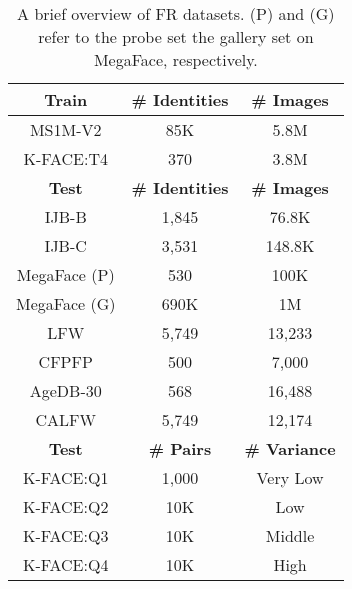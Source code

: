 \documentclass[10pt,twocolumn]{article}
\begin{document}
\begin{table}[!htbp]
    \caption{A brief overview of FR datasets. (P) and (G) refer to the probe set the gallery set on MegaFace, respectively.}
    \label{tab:datasets}
      \centering
        {\small
        \begin{tabular}[]{ c c c }
         \rowcolor{Cyan!20}
         \hline
         \textbf{Train} & \textbf{\# Identities} & \textbf{\# Images}  \\
         \hline
         MS1M-V2\cite{deng2019arcface} & 85K & 5.8M \\
         K-FACE:T4\cite{choi2021k} & 370 & 3.8M \\
         \hline
         \rowcolor{Cyan!20}
         \textbf{Test} & \textbf{\# Identities} & \textbf{\# Images}  \\
         \hline
         IJB-B\cite{whitelam2017iarpa} & 1,845 & 76.8K \\
         IJB-C\cite{maze2018iarpa} & 3,531 & 148.8K \\
         MegaFace (P)\cite{kemelmacher2016megaface} & 530 & 100K \\
         MegaFace (G)\cite{kemelmacher2016megaface} & 690K & 1M \\
         LFW\cite{huang2008labeled} & 5,749 & 13,233 \\
         CFPFP\cite{sengupta2016frontal} & 500 & 7,000 \\
         AgeDB-30\cite{moschoglou2017agedb} & 568 & 16,488 \\
         CALFW\cite{zheng2017cross} & 5,749 & 12,174 \\
         \rowcolor{Cyan!20}
         \hline
         \textbf{Test}\cite{choi2021k} & \textbf{\# Pairs} & \textbf{\# Variance}  \\
         \hline
         K-FACE:Q1 & 1,000 & Very Low \\
         K-FACE:Q2 & 10K & Low \\
         K-FACE:Q3 & 10K & Middle \\
         K-FACE:Q4 & 10K & High \\
         \hline
        \end{tabular}
        }
\end{table}
\end{document}
